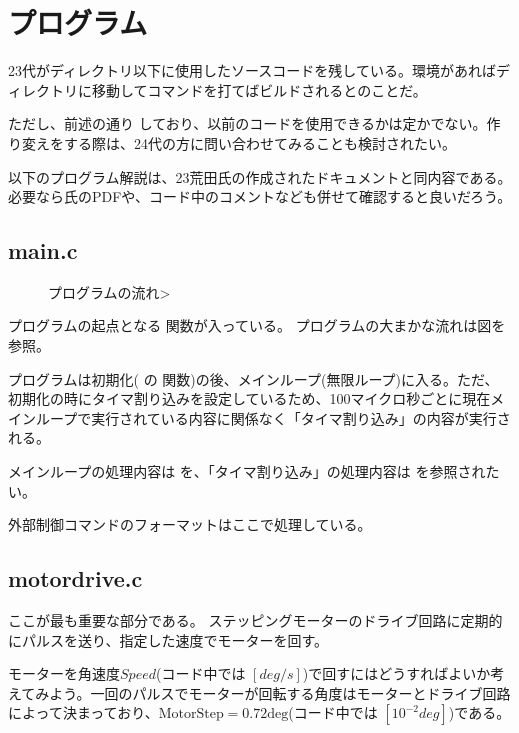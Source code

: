 \documentclass[letterpaper,10pt,dvipdfmx]{sphinxmanual}
\begin{document}
\section{プログラム}
\label{\detokenize{nissyu-idohen/saitama:id6}}
23代がディレクトリ以下に使用したソースコードを残している。環境があればディレクトリに移動してコマンドを打てばビルドされるとのことだ。

ただし、前述の通り
しており、以前のコードを使用できるかは定かでない。作り変えをする際は、24代の方に問い合わせてみることも検討されたい。

以下のプログラム解説は、23荒田氏の作成されたドキュメントと同内容である。必要なら氏のPDFや、コード中のコメントなども併せて確認すると良いだろう。


\subsection{main.c}
\label{\detokenize{nissyu-idohen/saitama:main-c}}\begin{figure}[htbp]
\centering
\capstart

\noindent{}
\caption{プログラムの流れ\textgreater{}}\label{\detokenize{nissyu-idohen/saitama:id12}}\end{figure}

プログラムの起点となる  関数が入っている。
プログラムの大まかな流れは図を参照。

プログラムは初期化( の
関数)の後、メインループ(無限ループ)に入る。ただ、初期化の時にタイマ割り込みを設定しているため、100マイクロ秒ごとに現在メインループで実行されている内容に関係なく「タイマ割り込み」の内容が実行される。

メインループの処理内容は  を、「タイマ割り込み」の処理内容は
 を参照されたい。

外部制御コマンドのフォーマットはここで処理している。


\subsection{motordrive.c}
\label{\detokenize{nissyu-idohen/saitama:motordrive-c}}
ここが最も重要な部分である。
ステッピングモーターのドライブ回路に定期的にパルスを送り、指定した速度でモーターを回す。

モーターを角速度\(Speed\)(コード中では \([deg/s]\))で回すにはどうすればよいか考えてみよう。一回のパルスでモーターが回転する角度はモーターとドライブ回路によって決まっており、\(\mathrm{MotorStep}=0.72 \mathrm{deg}\)(コード中では \([10^{-2}deg]\))である。
\end{document}
